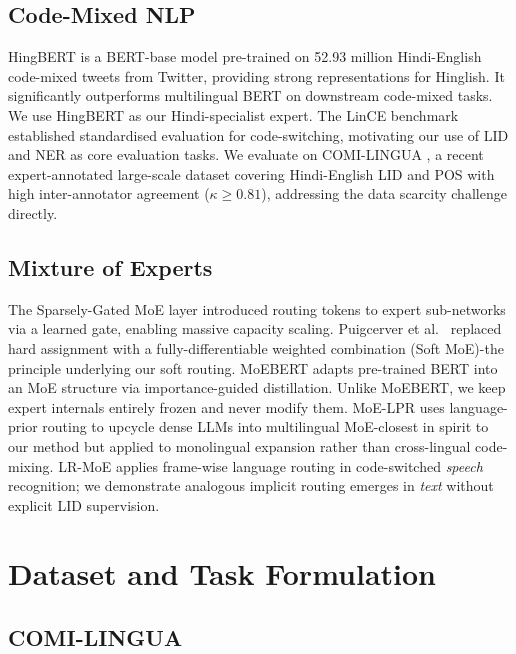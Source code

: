 \documentclass[conference]{IEEEtran}
\begin{document}
\subsection{Code-Mixed NLP}

HingBERT \cite{nayak2022hingbert} is a BERT-base model pre-trained on 52.93 million Hindi-English code-mixed tweets from Twitter, providing strong representations for Hinglish. It significantly outperforms multilingual BERT on downstream code-mixed tasks. We use HingBERT as our Hindi-specialist expert. The LinCE benchmark \cite{aguilar2020lince} established standardised evaluation for code-switching, motivating our use of LID and NER as core evaluation tasks. We evaluate on COMI-LINGUA \cite{sheth2024comilingua}, a recent expert-annotated large-scale dataset covering Hindi-English LID and POS with high inter-annotator agreement ($\kappa \geq 0.81$), addressing the data scarcity challenge directly.

\subsection{Mixture of Experts}

The Sparsely-Gated MoE layer \cite{shazeer2017moe} introduced routing tokens to expert sub-networks via a learned gate, enabling massive capacity scaling. Puigcerver et al.\ \cite{puigcerver2024softmoe} replaced hard assignment with a fully-differentiable weighted combination (Soft MoE)-the principle underlying our soft routing. MoEBERT \cite{zuo2022moebert} adapts pre-trained BERT into an MoE structure via importance-guided distillation. Unlike MoEBERT, we keep expert internals entirely frozen and never modify them. MoE-LPR \cite{zhou2024moelpr} uses language-prior routing to upcycle dense LLMs into multilingual MoE-closest in spirit to our method but applied to monolingual expansion rather than cross-lingual code-mixing. LR-MoE \cite{wang2023lrmoe} applies frame-wise language routing in code-switched \textit{speech} recognition; we demonstrate analogous implicit routing emerges in \textit{text} without explicit LID supervision.

\section{Dataset and Task Formulation}

\subsection{COMI-LINGUA}
\end{document}
